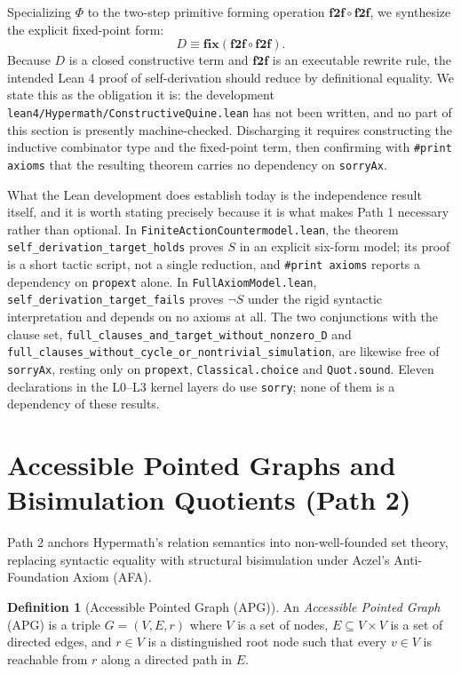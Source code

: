 \documentclass[11pt]{article}
\theoremstyle{definition}
\newtheorem{definition}[theorem]{Definition}
\begin{document}
Specializing $\Phi$ to the two-step primitive forming operation $\mathbf{f2f} \circ \mathbf{f2f}$, we synthesize the explicit fixed-point form:
\[
D \equiv \mathbf{fix}(\mathbf{f2f} \circ \mathbf{f2f}).
\]
Because $D$ is a closed constructive term and $\mathbf{f2f}$ is an executable rewrite rule, the intended Lean 4 proof of self-derivation should reduce by definitional equality. We state this as the obligation it is: the development \texttt{lean4/Hypermath/ConstructiveQuine.lean} has not been written, and no part of this section is presently machine-checked. Discharging it requires constructing the inductive combinator type and the fixed-point term, then confirming with \texttt{\#print axioms} that the resulting theorem carries no dependency on \texttt{sorryAx}.

What the Lean development does establish today is the independence result itself, and it is worth stating precisely because it is what makes Path 1 necessary rather than optional. In \texttt{FiniteActionCountermodel.lean}, the theorem \texttt{self\_derivation\_target\_holds} proves $S$ in an explicit six-form model; its proof is a short tactic script, not a single reduction, and \texttt{\#print axioms} reports a dependency on \texttt{propext} alone. In \texttt{FullAxiomModel.lean}, \texttt{self\_derivation\_target\_fails} proves $\neg S$ under the rigid syntactic interpretation and depends on no axioms at all. The two conjunctions with the clause set, \texttt{full\_\allowbreak clauses\_\allowbreak and\_\allowbreak target\_\allowbreak without\_\allowbreak nonzero\_\allowbreak D} and \texttt{full\_\allowbreak clauses\_\allowbreak without\_\allowbreak cycle\_\allowbreak or\_\allowbreak nontrivial\_\allowbreak simulation}, are likewise free of \texttt{sorryAx}, resting only on \texttt{propext}, \texttt{Classical.choice} and \texttt{Quot.sound}. Eleven declarations in the L0--L3 kernel layers do use \texttt{sorry}; none of them is a dependency of these results.

\section{Accessible Pointed Graphs and Bisimulation Quotients (Path 2)}
Path 2 anchors Hypermath's relation semantics into non-well-founded set theory, replacing syntactic equality with structural bisimulation under Aczel's Anti-Foundation Axiom (AFA).

\begin{definition}[Accessible Pointed Graph (APG)]
An \emph{Accessible Pointed Graph} (APG) is a triple $G = (V, E, r)$ where $V$ is a set of nodes, $E \subseteq V \times V$ is a set of directed edges, and $r \in V$ is a distinguished root node such that every $v \in V$ is reachable from $r$ along a directed path in $E$.
\end{definition}
\end{document}
